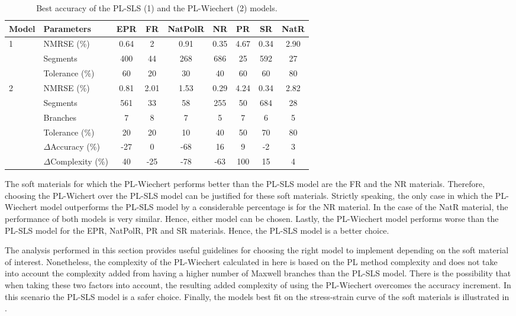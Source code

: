 \begin{table*}[htbp!]
	\centering
	\caption{Best accuracy of the PL-SLS (1) and the PL-Wiechert (2) models.}
	\label{tbl:PLModelsPerformance}
	\begin{tabular}{llccccccc} \toprule
		Model 					& Parameters 		& EPR	& FR & NatPolR & NR & PR & SR & NatR \\
		\hline
		\multirow{3}{*}{1}  & NMRSE (\%)		& 0.64	& 2 & 0.91 & 0.35 & 4.67 & 0.34 & 2.90 \\
								& Segments		& 400	& 44 & 268 & 686 & 25 & 592 & 27 \\
								& Tolerance (\%)	& 60	& 20 & 30 & 40 & 60 & 60 & 80 \\
		\hline 
		\multirow{6}{*}{2}  & NMRSE (\%)	& 0.81	& 2.01 & 1.53 & 0.29 & 4.24 & 0.34 & 2.82 \\
								& Segments		& 561	& 33 & 58 & 255 & 50 & 684 & 28 \\
								& Branches		& 7 	& 8 & 7 & 5 & 7 & 6 & 5 \\
								& Tolerance	(\%)	& 20	& 20 & 10 & 40 & 50 & 70 & 80 \\
								& $\Delta$Accuracy (\%)	& -27	& 0 & -68 & 16 & 9 & -2 & 3 \\
								& $\Delta$Complexity (\%)	& 40	& -25 & -78 & -63 & 100 & 15 & 4 \\
		\bottomrule
	\end{tabular}
\end{table*}

The soft materials for which the PL-Wiechert performs better than the PL-SLS model are the FR and the NR materials. Therefore, choosing the PL-Wichert over the PL-SLS model can be justified for these soft materials. Strictly speaking, the only case in which the PL-Wiechert model outperforms the PL-SLS model by a considerable percentage is for the NR material. In the case of the NatR material, the performance of both models is very similar. Hence, either model can be chosen. Lastly, the PL-Wiechert model performs worse than the PL-SLS model for the EPR, NatPolR, PR and SR materials. Hence, the PL-SLS model is a better choice.

The analysis performed in this section provides useful guidelines for choosing the right model to implement depending on the soft material of interest. Nonetheless, the complexity of the PL-Wiechert calculated in here is based on the PL method complexity and does not take into account the complexity added from having a higher number of Maxwell branches than the PL-SLS model. There is the possibility that when taking these two factors into account, the resulting added complexity of using the PL-Wiechert overcomes the accuracy increment. In this scenario the PL-SLS model is a safer choice. Finally, the models best fit on the stress-strain curve of the soft materials is illustrated in .

